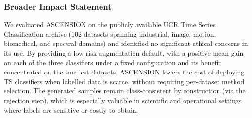 \subsubsection*{Broader Impact Statement}

We evaluated ASCENSION on the publicly available UCR Time
Series Classification archive (102 datasets spanning industrial,
image, motion, biomedical, and spectral domains) and
identified no significant ethical concerns in its use.
By providing a low-risk augmentation default, with a positive mean
gain on each of the three classifiers under a fixed configuration
and its benefit concentrated on the smallest datasets, ASCENSION
lowers the cost of deploying TS classifiers when labelled data is
scarce, without requiring per-dataset method selection. The
generated samples remain
class-consistent by construction (via the rejection step), which
is especially valuable in scientific and operational settings
where labels are sensitive or costly to obtain.
